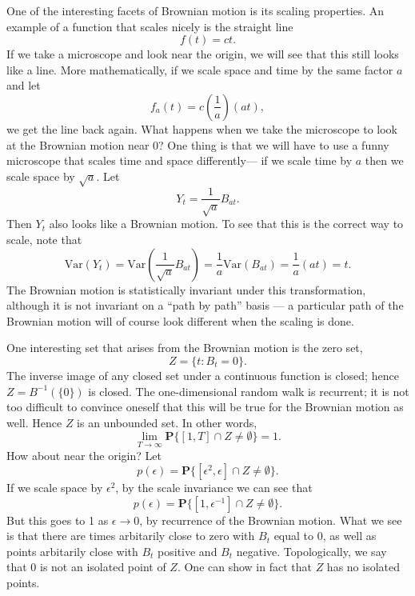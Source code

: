 \documentclass{stml-l}
\theoremstyle{definition}
\numberwithin{equation}{chapter}
\numberwithin{figure}{chapter}
\numberwithin{figure}{section}
\begin{document}
One of the interesting facets of Brownian motion is its scaling
properties. An example of a function that scales nicely is the
straight line
\begin{equation*}
f(t)=ct.
\end{equation*}
If we take a microscope and look near the origin, we will see that
this still looks like a line. More mathematically, if we scale space
and time by the same factor $a$ and let
\begin{equation*}
f_{a}(t)=c\left(\frac{1}{a}\right) (at),
\end{equation*}
we get the line back again. What happens when we take the microscope
to look at the Brownian motion near $0$? One thing is that we will
have to use a funny microscope that scales time and space
differently--- if we scale time by $a$ then we scale space by
$\sqrt{a}$. Let
\begin{equation*}
Y_{t}=\frac{1}{\sqrt{a}}B_{at}.
\end{equation*}
Then $Y_{t}$ also looks like a Brownian motion. To see that this is
the correct way to scale, note that
\begin{equation*}
\mathrm{Var}(Y_{t})= \mathrm{Var}\left(
\frac{1}{\sqrt{a}}B_{at}\right)=\frac{1}{a} \mathrm{Var}
(B_{at})=\frac{1}{a} (at)=t.
\end{equation*}
The Brownian motion is statistically invariant under this
transformation, although it is not invariant on a ``path by path''
basis --- a particular path of the Brownian motion will of course
look different when the scaling is done.

One interesting set that arises from the Brownian motion is the zero set,
\begin{equation*}
Z=\{t:B_{t}=0\}.
\end{equation*}
The inverse image of any closed set under a continuous function is
closed; hence $Z=B^{-1}(\{0\})$ is closed. The one-dimensional
random walk is recurrent; it is not too difficult to convince
oneself that this will be true for the Brownian motion as well.
Hence $Z$ is an unbounded set. In other words,
\begin{equation*}
\lim\limits_{T\rightarrow\infty}\mathbf{P}\{[1,T]\cap
Z\neq\emptyset\}=1.
\end{equation*}
How about near the origin? Let
\begin{equation*}
p(\epsilon)=\mathbf{P}\{[\epsilon^{2},\epsilon]\cap
Z\neq\emptyset\}.
\end{equation*}
If we scale space by $\epsilon^{2}$, by the scale invariance we can
see that
\begin{equation*}
p(\epsilon)=\mathbf{P}\{[1,\epsilon^{-1}]\cap Z\neq\emptyset\}.
\end{equation*}
But this goes to 1 as $\epsilon\rightarrow 0$, by recurrence of the
Brownian motion. What we see is that there are times arbitarily
close to zero with $B_{t}$ equal to $0$, as well as points
arbitarily close with $B_{t}$ positive and $B_{t}$ negative.
Topologically, we say that $0$ is not an isolated point of $Z$. One
can show in fact that $Z$ has no isolated points.
\end{document}

